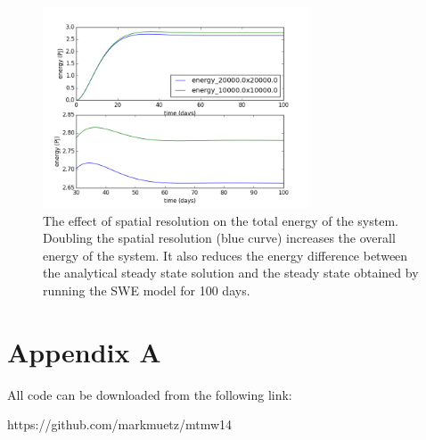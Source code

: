\documentclass{article}
\begin{document}
\begin{figure}[ht!]
    \centering
    \includegraphics[width=300px]{figures/task_b_energy}
    \caption{The effect of spatial resolution on the total energy of the system. Doubling the
    spatial resolution (blue curve) increases the overall energy of the system. It also reduces the
energy difference between the analytical steady state solution and the steady state obtained by
running the SWE model for 100 days.}
    \label{fig:task_b_energy}
\end{figure}

\section*{Appendix A}

All code can be downloaded from the following link:

https://github.com/markmuetz/mtmw14
\end{document}
